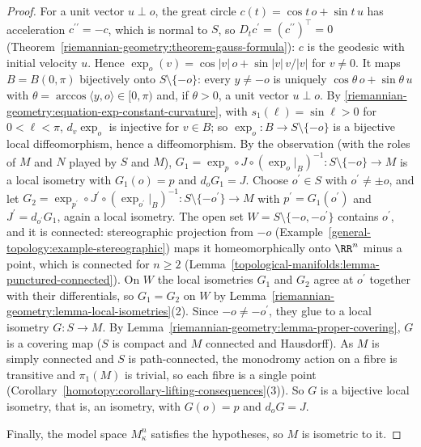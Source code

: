 \begin{proof}
For a unit vector $u \perp o$, the great circle $c(t) = \cos t\,o + \sin t\,u$ has acceleration $c^{\prime\prime} = -c$, which is normal to $S$, so
$D_tc^{\prime} = (c^{\prime\prime})^\top = 0$ (Theorem~\ref{riemannian-geometry:theorem-gauss-formula}): $c$ is the geodesic with initial velocity $u$. Hence
$\exp_o(v) = \cos|v|\,o + \sin|v|\,v/|v|$ for $v \neq 0$. It maps $B = B(0, \pi)$ bijectively onto $S \setminus \{-o\}$:
every $y \neq -o$ is uniquely $\cos\theta\,o + \sin\theta\,u$ with $\theta = \arccos\langle y, o\rangle \in [0, \pi)$ and, if $\theta > 0$, a unit vector $u \perp o$.
By \eqref{riemannian-geometry:equation-exp-constant-curvature}, with $s_1(\ell) = \sin\ell > 0$ for $0 < \ell < \pi$, $d_v\exp_o$ is injective for $v \in B$; so $\exp_o \colon B \to S \setminus \{-o\}$ is a bijective local
diffeomorphism, hence a diffeomorphism. By the observation (with the roles of $M$ and $N$ played by $S$ and $M$),
$G_1 = \exp_p \circ J \circ (\exp_o|_B)^{-1} \colon S \setminus \{-o\} \to M$ is a local isometry with $G_1(o) = p$ and $d_oG_1 = J$. Choose $o^{\prime} \in S$ with
$o^{\prime} \neq \pm o$, and let $G_2 = \exp_{p^{\prime}} \circ J^{\prime} \circ (\exp_{o^{\prime}}|_B)^{-1} \colon S \setminus \{-o^{\prime}\} \to M$ with
$p^{\prime} = G_1(o^{\prime})$ and $J^{\prime} = d_{o^{\prime}}G_1$, again a local isometry. The open set $W = S \setminus \{-o, -o^{\prime}\}$ contains $o^{\prime}$, and it
is connected: stereographic projection from $-o$ (Example~\ref{general-topology:example-stereographic}) maps it homeomorphically onto $\RR^n$ minus a point, which is
connected for $n \geq 2$ (Lemma~\ref{topological-manifolds:lemma-punctured-connected}). On $W$ the local isometries $G_1$ and $G_2$ agree at $o^{\prime}$ together with
their differentials, so $G_1 = G_2$ on $W$ by Lemma~\ref{riemannian-geometry:lemma-local-isometries}(2). Since $-o \neq -o^{\prime}$, they glue to a local isometry
$G \colon S \to M$. By Lemma~\ref{riemannian-geometry:lemma-proper-covering}, $G$ is a covering map ($S$ is compact and $M$ connected and Hausdorff). As $M$ is simply
connected and $S$ is path-connected, the monodromy action on a fibre is transitive and $\pi_1(M)$ is trivial, so each fibre is a single point
(Corollary~\ref{homotopy:corollary-lifting-consequences}(3)). So $G$ is a bijective local isometry, that is, an isometry, with $G(o) = p$ and $d_oG = J$.

Finally, the model space $M^n_\kappa$ satisfies the hypotheses, so $M$ is isometric to it.
\end{proof}

